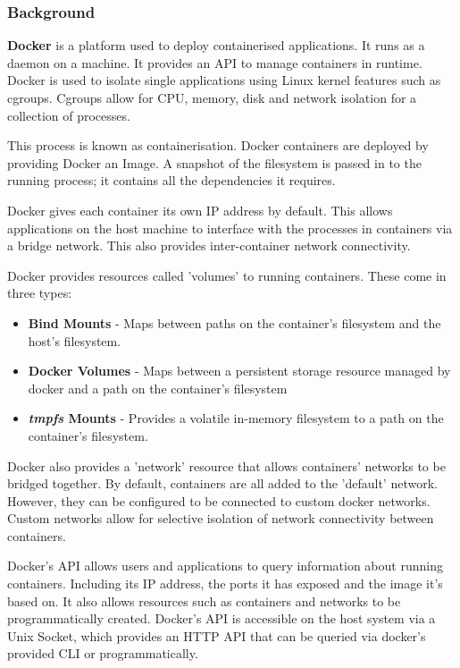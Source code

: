 \documentclass[a4paper,12pt]{report}
\begin{document}
\subsubsection{Background}
\textbf{Docker} is a platform used to deploy containerised applications. It runs as a daemon on a machine. It provides an API to manage
containers in runtime. Docker is used to isolate single applications using Linux kernel features such as cgroups. Cgroups allow for CPU, memory, disk and network isolation for a collection of processes.

This process is known as containerisation. Docker containers are deployed by providing Docker an Image. A snapshot of the filesystem is passed in to the running process; it contains all the dependencies it requires.

Docker gives each container its own IP address by default. This allows applications on the host machine to interface with the processes in containers via a bridge network. This also provides inter-container network connectivity.

Docker provides resources called 'volumes' to running containers. These come in three types: 

\begin{itemize}
    \item \textbf{Bind Mounts} - Maps between paths on the container's filesystem and the host's filesystem.
    \item \textbf{Docker Volumes} - Maps between a persistent storage resource managed by docker and a path on the container's filesystem
    \item \textbf{\textit{tmpfs} Mounts} - Provides a volatile in-memory filesystem to a path on the container's filesystem.
\end{itemize}

Docker also provides a 'network' resource that allows containers' networks to be bridged together. By default, containers are all added to the 'default' network. However, they can be configured to be connected to custom docker networks. Custom networks allow for selective isolation of network connectivity between containers.

Docker's API allows users and applications to query information about running containers. Including its IP address, the ports it has exposed and the image it's based on. It also allows resources such as containers and networks to be programmatically created. Docker's API is accessible on the host system via a Unix Socket, which provides an HTTP API that can be queried via docker's provided CLI or programmatically.
\end{document}

